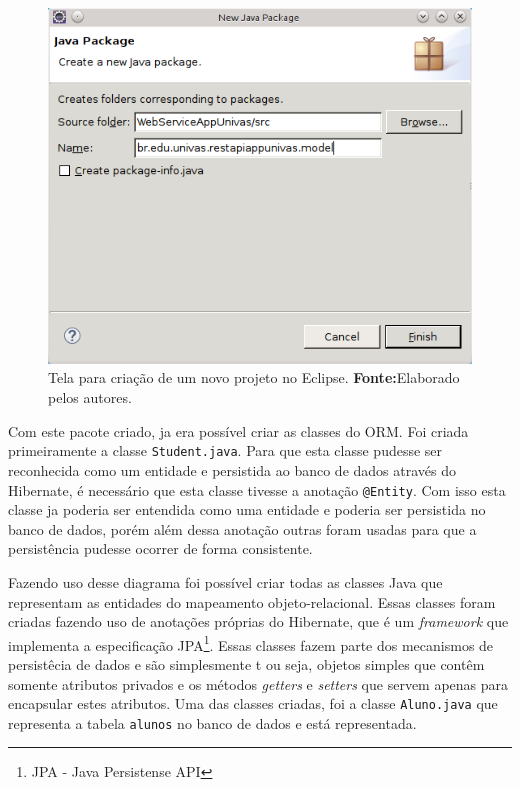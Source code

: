 	\begin{figure}[h!]
		\centerline{\includegraphics[scale=0.8]{./imagens/2_q_metodologico/4_procedimentos_resultados/43_webservice/432_desenvolvimento/desws8.png}}
		\caption[Tela para criação de um novo projeto no Eclipse]{Tela para criação de um novo projeto no Eclipse.
			\textbf{Fonte:}Elaborado pelos autores.}
		\label{fig:desws8}
	\end{figure}
	
	\pagebreak


		
	\par Com este pacote criado, ja era possível criar as classes do ORM. Foi
criada primeiramente a classe \texttt{Student.java}. Para que esta classe
pudesse ser reconhecida como um entidade e persistida ao banco de dados através
do Hibernate, é necessário que esta classe tivesse a anotação
\texttt{@Entity}. Com isso esta classe ja poderia ser entendida como uma
entidade e poderia ser persistida no banco de dados, porém além dessa anotação
outras foram usadas para que a persistência pudesse ocorrer de forma
consistente.





	
	
			
	
		\par Fazendo uso desse diagrama foi possível criar todas as classes 
	Java que representam as entidades do mapeamento objeto-relacional. 
	Essas classes foram criadas fazendo uso de anotações próprias do
	Hibernate, que é um \textit{framework} que implementa a especificação
	JPA\footnote{JPA - Java Persistense API}. Essas classes fazem parte
	dos mecanismos de persistêcia de dados e são simplesmente t ou seja, objetos
	simples que contêm somente atributos privados e os métodos \textit{getters} e
	\textit{setters} que servem apenas para encapsular estes atributos. Uma das
	classes criadas, foi a classe \texttt{Aluno.java} que representa a tabela
	\texttt{alunos} no banco de dados e está representada.
		
